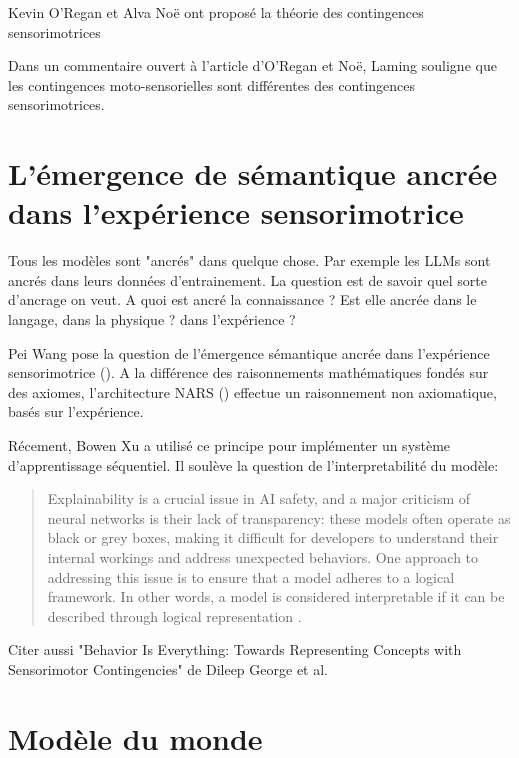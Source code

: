 Kevin O'Regan et Alva Noë ont proposé la théorie des contingences sensorimotrices \cite{oregan_sensorimotor_2001}

Dans un commentaire ouvert à l'article d'O'Regan et Noë, Laming \cite{laming_distinction_2001} souligne que les contingences \og moto-sensorielles \fg sont différentes des contingences sensorimotrices. 

\section{L'émergence de sémantique ancrée dans l'expérience sensorimotrice}

Tous les modèles sont "ancrés" dans quelque chose. 
Par exemple les LLMs sont ancrés dans leurs données d'entrainement. 
La question est de savoir quel sorte d'ancrage on veut. 
A quoi est ancré la connaissance ? Est elle ancrée dans le langage, dans la physique ? dans l'expérience 
? %


Pei Wang \cite{wang_experience-grounded_2005} pose la question de l'émergence sémantique ancrée dans l'expérience sensorimotrice ().
A la différence des raisonnements mathématiques fondés sur des axiomes, l'architecture NARS () effectue un raisonnement non axiomatique, basés sur l'expérience.

Récement, Bowen Xu \cite{xu_brain-inspired_2025} a utilisé ce principe pour implémenter un système d'apprentissage séquentiel. 
Il soulève la question de l'interpretabilité du modèle: 
\begin{quote}
	Explainability is a crucial issue in AI safety, and a major criticism of neural networks is their lack of transparency: these models often operate as black or grey boxes, making it difficult for developers to understand their internal workings and address unexpected behaviors. One approach to addressing this issue is to ensure that a model adheres to a logical framework. In other words, a model is considered interpretable if it can be described through logical representation \cite[p.~1]{xu_brain-inspired_2025}.
\end{quote}


Citer aussi "Behavior Is Everything: Towards Representing Concepts with Sensorimotor Contingencies" de Dileep George et al.


\section{Modèle du monde}

